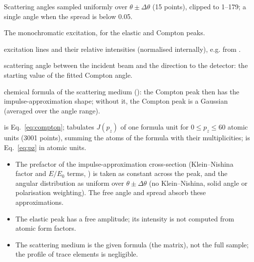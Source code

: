 Scattering angles sampled uniformly over $\theta\pm\Delta\theta$ (15 points), clipped to
1--179\textdegree; a single angle when the spread is below 0.05\textdegree.

The monochromatic excitation, for the elastic and Compton peaks.
\begin{args}
\item[energies\_ev, weights] excitation lines and their relative intensities (normalised
  internally), e.g. from .
\item[angle\_deg] scattering angle between the incident beam and the direction to the
  detector: the starting value of the fitted Compton angle.
\item[scatterer] chemical formula of the scattering medium (): the Compton peak then
  has the impulse-approximation shape; without it, the Compton peak is a Gaussian (averaged
  over the angle range).
\end{args}
  is Eq.~\eqref{eq:compton};
 tabulates $J(p_z)$ of one formula unit for $0\le p_z\le60$ atomic units
(3001 points), summing the atoms of the formula with their multiplicities; 
is Eq.~\eqref{eq:pz} in atomic units.
\begin{hyp}
\begin{itemize}[nosep,leftmargin=1em]
\item The prefactor of the impulse-approximation cross-section (Klein--Nishina factor and
  $E/E_0$ terms, \citealp{Klein1929,Ribberfors1975}) is taken as constant across the peak, and
  the angular distribution as uniform over $\theta\pm\Delta\theta$ (no Klein--Nishina, solid
  angle or polarisation weighting). The free angle and spread absorb these approximations.
\item The elastic peak has a free amplitude; its intensity is not computed from atomic form
  factors.
\item The scattering medium is the given formula (the matrix), not the full sample; the
  profile of trace elements is negligible.
\end{itemize}
\end{hyp}

